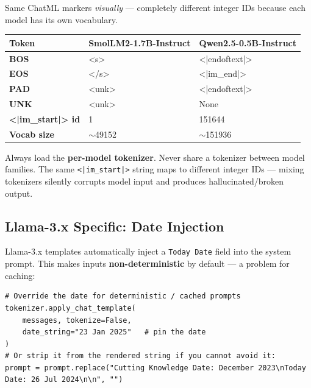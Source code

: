 \documentclass[11pt,a4paper]{article}
\newcommand{\tok}[1]{\texttt{\color{accentPurple}#1}}
\begin{document}
Same ChatML markers \emph{visually} --- completely different integer IDs because each model has its own vocabulary.

\renewcommand{\arraystretch}{1.4}
\begin{tabularx}{\linewidth}{>{\bfseries}l >{\ttfamily\color{primaryBlue}}X >{\ttfamily\color{teal}}X}
\toprule
\normalfont\textbf{Token} & SmolLM2-1.7B-Instruct & Qwen2.5-0.5B-Instruct \\
\midrule
BOS             & \textless s\textgreater{}             & \textless|endoftext|\textgreater{} \\
EOS             & \textless/s\textgreater{}            & \textless|im\_end|\textgreater{} \\
PAD             & \textless unk\textgreater{}          & \textless|endoftext|\textgreater{} \\
UNK             & \textless unk\textgreater{}          & None \\
\textless|im\_start|\textgreater{} id & 1                   & 151644 \\
Vocab size      & $\sim$49152                         & $\sim$151936 \\
\bottomrule
\end{tabularx}

\begin{tcolorbox}[alertbox={Critical Gotcha}]
Always load the \textbf{per-model tokenizer}. Never share a tokenizer between model families. The same \tok{<|im\_start|>} string maps to different integer IDs --- mixing tokenizers silently corrupts model input and produces hallucinated/broken output.
\end{tcolorbox}

\subsection{Llama-3.x Specific: Date Injection}

Llama-3.x templates automatically inject a \texttt{Today Date} field into the system prompt. This makes inputs \textbf{non-deterministic} by default --- a problem for caching:

\begin{lstlisting}[style=pycode]
# Override the date for deterministic / cached prompts
tokenizer.apply_chat_template(
    messages, tokenize=False,
    date_string="23 Jan 2025"   # pin the date
)
# Or strip it from the rendered string if you cannot avoid it:
prompt = prompt.replace("Cutting Knowledge Date: December 2023\nToday Date: 26 Jul 2024\n\n", "")
\end{lstlisting}
\end{document}
